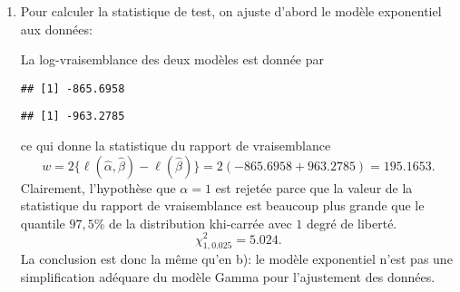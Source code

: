 \begin{solution}{6.11}
\begin{enumerate}
\item Pour calculer la statistique de test, on ajuste d'abord le modèle exponentiel aux données:
\begin{knitrout}
\color{fgcolor}\begin{kframe}
\begin{alltt}
 \hlkwb{<-} \hlstd{=}\hlstd{)}
\end{alltt}
\end{kframe}
\end{knitrout}
La log-vraisemblance des deux modèles est donnée par
\begin{knitrout}
\color{fgcolor}\begin{kframe}
\begin{alltt}
\hlopt{$}
\end{alltt}
\begin{verbatim}
## [1] -865.6958
\end{verbatim}
\begin{alltt}
\hlopt{$}
\end{alltt}
\begin{verbatim}
## [1] -963.2785
\end{verbatim}
\end{kframe}
\end{knitrout}
ce qui donne la statistique du rapport de vraisemblance
$$
w= 2\{\ell(\hat \alpha,\hat \beta)-\ell(\hat \beta)\} = 2 (-865.6958 + 963.2785) = 195.1653.
$$
Clairement, l'hypothèse que $\alpha=1$ est rejetée parce que la valeur de la statistique du rapport de vraisemblance est beaucoup plus grande que le quantile $97,5$\% de la distribution khi-carrée avec $1$ degré de liberté.
$$
\chi^2_{1,0.025} = 5.024.
$$
La conclusion est donc la même qu'en b): le modèle exponentiel n'est pas une simplification adéquare du modèle Gamma pour l'ajustement des données.
\end{enumerate}
\end{solution}
